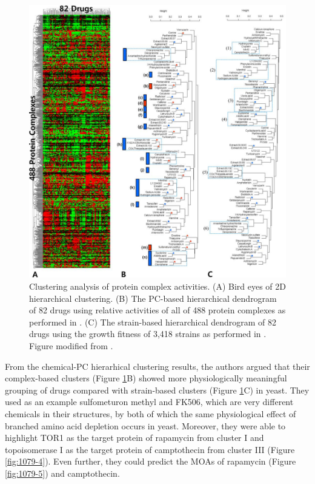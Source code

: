 \documentclass[12pt,fullpage,singlespace]{article}
\begin{document}
\begin{figure}
\centering
\includegraphics[width=\linewidth]{1079-3.png}
\caption{Clustering analysis of protein complex activities. (A) Bird eyes of 2D hierarchical clustering. (B) The PC-based hierarchical dendrogram of 82 drugs using relative activities of all of 488 protein complexes as performed in \citep{1079}. (C) The strain-based hierarchical dendrogram of 82 drugs using the growth fitness of 3,418 strains as performed in \citep{1078}. Figure modified from \citep{1079}.}
\label{fig:1079-3}
\end{figure}

From the chemical-PC hierarhical clustering results, the authors argued that their complex-based clusters (Figure \ref{fig:1079-3}B) showed more physiologically meaningful grouping of drugs compared with strain-based clusters (Figure \ref{fig:1079-3}C) in yeast. They used as an example sulfometuron methyl and FK506, which are very different chemicals in their structures, by both of which the same physiological effect of branched amino acid depletion occurs in yeast. Moreover, they were able to highlight TOR1 as the target protein of rapamycin from cluster I and topoisomerase I as the target protein of camptothecin from cluster III (Figure \ref{fig:1079-4}). Even further, they could predict the MOAs of rapamycin (Figure \ref{fig:1079-5}) and camptothecin.
\end{document}
